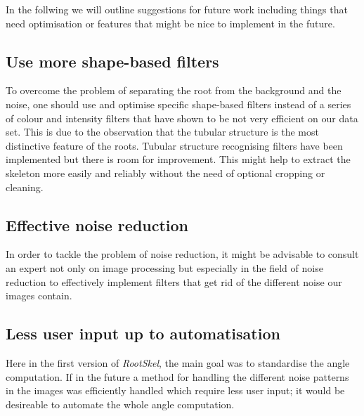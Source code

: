 In the follwing we will outline suggestions for future work including things that need optimisation or features that might be nice to implement in the future. 


\subsection{Use more shape-based filters}

To overcome the problem of separating the root from the background and the noise, one should use and optimise specific shape-based filters instead of a series of colour and intensity filters that have shown to be not very efficient on our data set. This is due to the observation that the tubular structure is the most distinctive feature of the roots. Tubular structure recognising filters have been implemented but there is room for improvement. This might help to extract the skeleton more easily and reliably without the need of optional cropping or cleaning.


\subsection{Effective noise reduction}

In order to tackle the problem of noise reduction, it might be advisable to consult an expert not only on image processing but especially in the field of noise reduction to effectively implement filters that get rid of the different noise our images contain. 



\subsection{Less user input up to automatisation}

Here in the first version of \textit{RootSkel}, the main goal was to standardise the angle computation. If in the future  a method for handling the different noise patterns in the images was efficiently handled which require less user input; it would be desireable to automate the whole angle computation.

 
